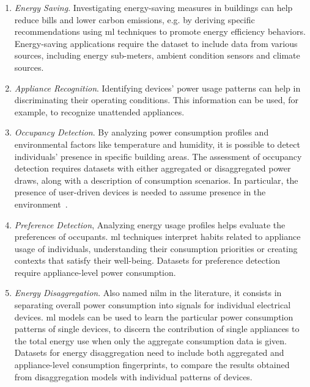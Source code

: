 \newpage

\begin{enumerate}[label={\textit{A\arabic*.}}, leftmargin=3.5em]
    \item \textit{Energy Saving}. Investigating energy-saving measures in buildings can help reduce bills and lower carbon emissions, e.g. by deriving specific recommendations using \acrfull{ml} techniques to promote energy efficiency behaviors. Energy-saving applications require the dataset to include data from various sources, including energy sub-meters, ambient condition sensors and climate sources.

    \item \textit{Appliance Recognition}. Identifying devices' power usage patterns can help in discriminating their operating conditions. This information can be used, for example, to recognize unattended appliances.

    \item \textit{Occupancy Detection}. By analyzing power consumption profiles and environmental factors like temperature and humidity, it is possible to detect individuals' presence in specific building areas. The assessment of occupancy detection requires datasets with either aggregated or disaggregated power draws, along with a description of consumption scenarios. In particular, the presence of user-driven devices is needed to assume presence in the environment~\parencite{monacchiGREENDEnergyConsumption2014}.

    \item \textit{Preference Detection}, Analyzing energy usage profiles helps evaluate the preferences of occupants. \acrshort{ml} techniques interpret habits related to appliance usage of individuals, understanding their consumption priorities or creating contexts that satisfy their well-being. Datasets for preference detection require appliance-level power consumption.

    \item \textit{Energy Disaggregation}. Also named \acrfull{nilm} in the literature, it consists in separating overall power consumption into signals for individual electrical devices. \acrshort{ml} models can be used to learn the particular power consumption patterns of single devices, to discern the contribution of single appliances to the total energy use when only the aggregate consumption data is given. Datasets for energy disaggregation need to include both aggregated and appliance-level consumption fingerprints, to compare the results obtained from disaggregation models with individual patterns of devices.


\end{enumerate}
